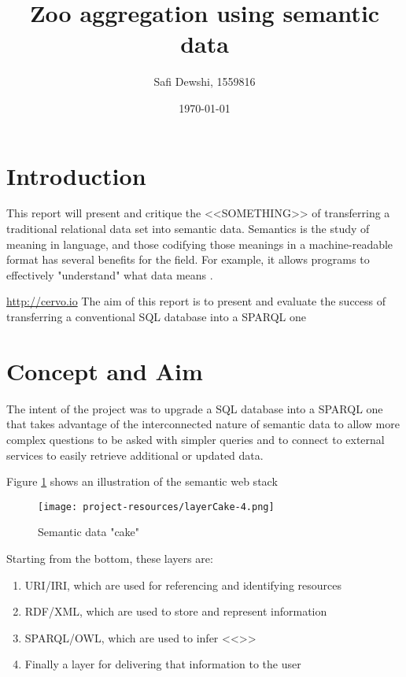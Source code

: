 \documentclass[a4paper]{article}
\author{Safi Dewshi, 1559816}
\title{Zoo aggregation using semantic data}
\date{\today}
\begin{document}
\pagestyle{fancy}
\lhead{}
\maketitle
\pagebreak
\tableofcontents
\pagebreak


\section{Introduction}
This report will present and critique the <<SOMETHING>> of transferring a traditional relational data set into semantic data. Semantics is the study of meaning in language, and those codifying those meanings in a machine-readable format has several benefits for the field. For example, it allows programs to effectively "understand" what data means \autocite{Szeredi2014}.


\url{http://cervo.io}
The aim of this report is to present and evaluate the success of transferring a conventional SQL database into a SPARQL one \autocite{Szeredi2014}



\section{Concept and Aim}
The intent of the project was to upgrade a SQL database into a SPARQL one that takes advantage of the interconnected nature of semantic data to allow more complex questions to be asked with simpler queries and to connect to external services to easily retrieve additional or updated data.

Figure \ref{fig:semanticcake} shows an illustration of the semantic web stack
\begin{figure}[h!]
	\centering
	\texttt{[image: project-resources/layerCake-4.png]}
	\caption{Semantic data "cake"\autocite{SemanticStack}}
	\label{fig:semanticcake}
\end{figure}
Starting from the bottom, these layers are:
\begin{enumerate}
\item URI/IRI, which are used for referencing and identifying resources
\item RDF/XML, which are used to store and represent information
\item SPARQL/OWL, which are used to infer <<>>
\item Finally a layer for delivering that information to the user
\end{enumerate}
\end{document}

